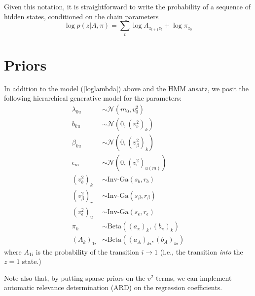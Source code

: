 \documentclass[11pt]{article}
\begin{document}
Given this notation, it is straightforward to write the probability of a sequence of hidden states, conditioned on the chain parameters
\begin{equation}
    \log p(z|A, \pi) = \sum_t \log A_{z_{t+1} z_t} + \log \pi_{z_0}
\end{equation}

\section{Priors}
In addition to the model (\ref{loglambda}) above and the HMM ansatz, we posit the following hierarchical generative model for the parameters:
\begin{align}
    \lambda_{0u} &\sim \mathcal{N}(m_0, v^2_0) \\
    b_{ku} &\sim \mathcal{N}\left(0, (v^2_b)_{k}\right) \\
    \beta_{ku} &\sim \mathcal{N}\left(0, (v^2_\beta)_{k}\right) \\
    \epsilon_m &\sim \mathcal{N}\left(0, (v^2_\epsilon)_{u(m)}\right) \\
    (v^2_b)_{k} &\sim \text{Inv-Ga}\left(s_b, r_b \right) \\
    (v^2_\beta)_{r} &\sim \text{Inv-Ga}\left(s_\beta, r_\beta \right) \\
    (v^2_\epsilon)_{u} &\sim \text{Inv-Ga}\left(s_\epsilon, r_\epsilon \right) \\
    \pi_k &\sim \mathrm{Beta}\left((a_\pi)_k, (b_\pi)_k \right) \\
    \left(A_k \right)_{1i} &\sim \mathrm{Beta}\left((a_A)_{ki}, (b_A)_{ki} \right)
    \end{align}
where $A_{1i}$ is the probability of the transition $i \rightarrow 1$ (i.e., the transition \emph{into} the $z = 1$ state.)

Note also that, by putting sparse priors on the $v^2$ terms, we can implement automatic relevance determination (ARD) on the regression coefficients.
\end{document}
